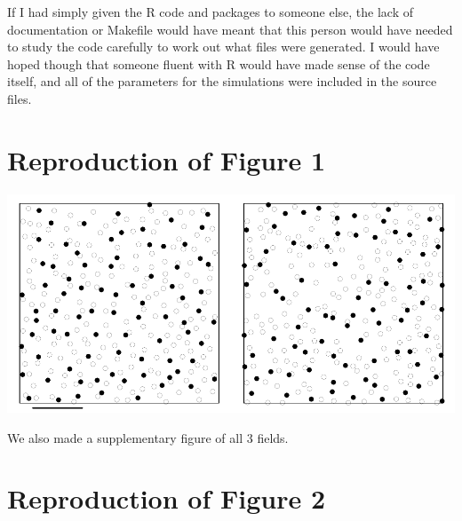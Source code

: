 If I had simply given the R code and packages to someone else, the lack
of documentation or Makefile would have meant that this person would
have needed to study the code carefully to work out what files were
generated. I would have hoped though that someone fluent with R would
have made sense of the code itself, and all of the parameters for the
simulations were included in the source files.

\section{Reproduction of Figure 1}

\includegraphics{../hor_fieldA_col.pdf}

We also made a supplementary figure of all 3 fields.

\section{Reproduction of Figure 2}


